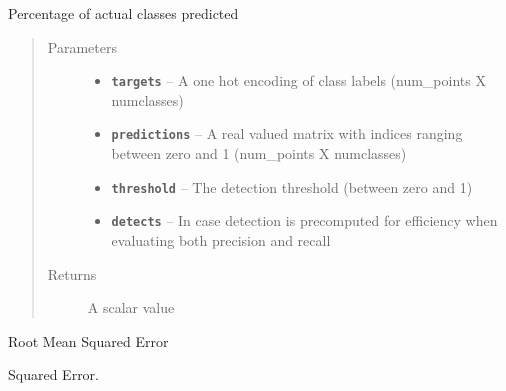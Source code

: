 \documentclass[letterpaper,10pt,english]{sphinxmanual}
\begin{document}
\begin{fulllineitems}
\label{node_ops:node_ops.recall}
Percentage of actual classes predicted
\begin{quote}\begin{description}
\item[{Parameters}] \leavevmode\begin{itemize}
\item {} 
\textbf{\texttt{targets}} -- A one hot encoding of class labels (num\_points X numclasses)

\item {} 
\textbf{\texttt{predictions}} -- A real valued matrix with indices ranging between zero and 1 (num\_points X numclasses)

\item {} 
\textbf{\texttt{threshold}} -- The detection threshold (between zero and 1)

\item {} 
\textbf{\texttt{detects}} -- In case detection is precomputed for efficiency when evaluating both precision and recall

\end{itemize}

\item[{Returns}] \leavevmode
A scalar value

\end{description}\end{quote}

\end{fulllineitems}


\begin{fulllineitems}
\label{node_ops:node_ops.rmse}
Root Mean Squared Error

\end{fulllineitems}


\begin{fulllineitems}
\label{node_ops:node_ops.se}
Squared Error.

\end{fulllineitems}

\end{document}
